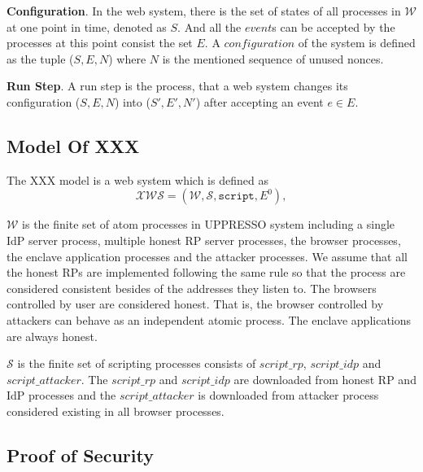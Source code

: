 \vspace{1mm}\noindent\textbf{Configuration}. 
In the web system, there is the set of states of all processes in $\mathcal{W}$ at one point in time, denoted as $S$. 
And all the $event$s can be accepted by the processes at this point consist the set $E$.
A $configuration$ of the system is defined as the tuple ($S, E, N$) where $N$ is the mentioned sequence of unused nonces. 

\vspace{1mm}\noindent\textbf{Run Step}. A run step is the process, that a web system changes its configuration ($S, E, N$) into ($S', E', N'$) after accepting an event $e \in E$. 

\subsection{Model Of XXX}
The XXX model is a web system which is defined as 
\begin{equation*}
    \mathcal{XWS} = (\mathcal{W}, \mathcal{S}, \mathtt{script}, E^0),
\end{equation*}

$\mathcal{W}$ is the finite set of atom processes in UPPRESSO system including a single IdP server process, multiple honest RP server processes, the browser processes, the enclave application processes and the attacker processes. We assume that all the honest RPs are implemented following the same rule so that the process are considered consistent besides of the addresses they listen to. The browsers controlled by user are considered honest. That is, the browser controlled by attackers can behave as  an independent atomic process. The enclave applications are always honest.

$\mathcal{S}$ is the finite set of scripting processes consists of $script\_rp$, $script\_idp$ and $script\_attacker$. The $script\_rp$ and $script\_idp$ are downloaded from honest RP and IdP processes and the $script\_attacker$ is downloaded from attacker process considered existing in all browser processes. 

\subsection{Proof of Security}


